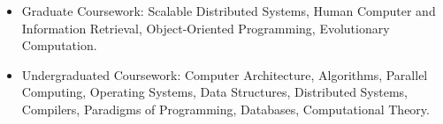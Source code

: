 \documentclass[10pt,letterpaper]{article}
\begin{document}
\begin{itemize}[leftmargin=*]
  \item  Graduate Coursework: Scalable Distributed Systems, Human Computer and Information Retrieval, Object-Oriented Programming, Evolutionary Computation.
  \item Undergraduated Coursework: Computer Architecture, Algorithms, Parallel Computing, Operating Systems, Data Structures, Distributed Systems, Compilers, Paradigms of Programming, Databases, Computational Theory.
\end{itemize}

  \vspace{0.20em} 
\end{document}
